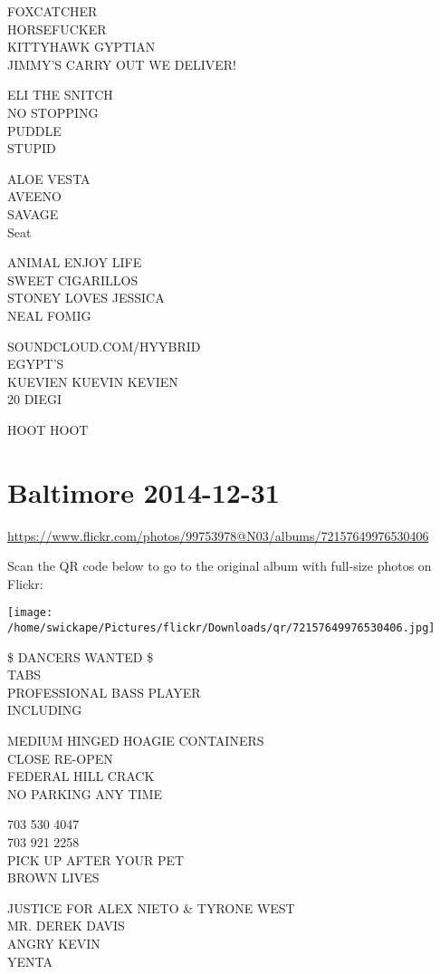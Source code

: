 \documentclass[10pt,letterpaper]{article}
\begin{document}
FOXCATCHER\\
HORSEFUCKER\\
KITTYHAWK GYPTIAN\\
JIMMY'S CARRY OUT WE DELIVER!

ELI THE SNITCH\\
NO STOPPING\\
PUDDLE\\
STUPID

ALOE VESTA\\
AVEENO\\
SAVAGE\\
Seat

ANIMAL ENJOY LIFE\\
SWEET CIGARILLOS\\
STONEY LOVES JESSICA\\
NEAL FOMIG

SOUNDCLOUD.COM/HYYBRID\\
EGYPT'S\\
KUEVIEN KUEVIN KEVIEN\\
20 DIEGI

HOOT HOOT


\section*{Baltimore 2014-12-31}

\url{https://www.flickr.com/photos/99753978@N03/albums/72157649976530406}

Scan the QR code below to go to the original album with full-size photos on Flickr:

\texttt{[image: /home/swickape/Pictures/flickr/Downloads/qr/72157649976530406.jpg]}


\$ DANCERS WANTED \$\\
TABS\\
PROFESSIONAL BASS PLAYER\\
INCLUDING

MEDIUM HINGED HOAGIE CONTAINERS\\
CLOSE RE{-}OPEN\\
FEDERAL HILL CRACK\\
NO PARKING ANY TIME

703 530 4047\\
703 921 2258\\
PICK UP AFTER YOUR PET\\
BROWN LIVES

JUSTICE FOR ALEX NIETO \& TYRONE WEST\\
MR. DEREK DAVIS\\
ANGRY KEVIN\\
YENTA
\end{document}
